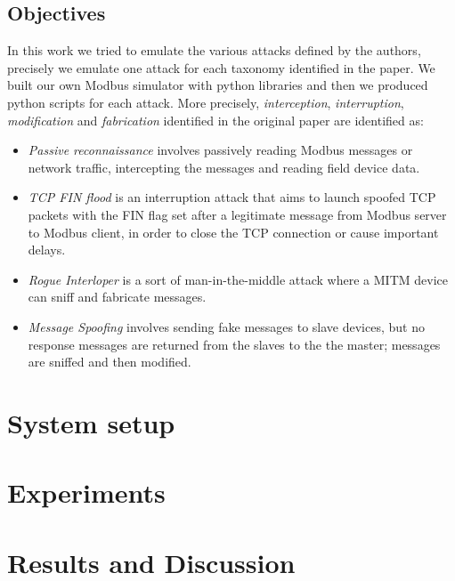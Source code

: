 \documentclass[12pt]{article}
\begin{document}
\subsection{Objectives}
In this work we tried to emulate the various attacks defined by the authors, precisely we emulate one attack for each taxonomy identified in the paper. We built our own Modbus simulator with python libraries and then we produced python scripts for each attack.
More precisely, \textit{interception}, \textit{interruption}, \textit{modification} and \textit{fabrication} identified in the original paper are identified as:
\begin{itemize}
    \item \textit{Passive reconnaissance} involves passively reading Modbus messages or network traffic, intercepting the messages and reading field device data.
    \item \textit{TCP FIN flood} is an interruption attack that aims to launch spoofed TCP packets with the FIN flag set after a legitimate message from Modbus server to Modbus client, in order to close the TCP connection or cause important delays.
    \item \textit{Rogue Interloper} is a sort of man-in-the-middle attack where a MITM device can sniff and fabricate messages.
    \item \textit{Message Spoofing} involves sending fake messages to slave devices, but no response messages are returned from the slaves to the the master; messages are sniffed and then modified.
\end{itemize}

\section{System setup}
\section{Experiments}
\section{Results and Discussion}
\printbibliography 
\end{document}
